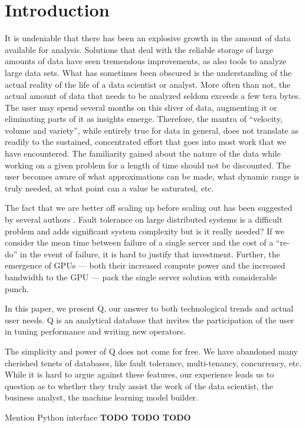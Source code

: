 \section{Introduction}

It is undeniable that there has been an explosive growth in the 
amount of data available for analysis. Solutions that 
deal with the reliable storage of large amounts of data have seen tremendous
improvements, as also tools to analyze large data sets. What has sometimes been
obscured is the understanding of the actual reality of the life of a data
scientist or analyst. More often than not, the actual amount of data that needs
to be analyzed seldom exceeds a few tera bytes\cite{Dittrich2015}. The user may spend
several months on this sliver of data, augmenting it or eliminating parts of it
as insights emerge. Therefore, the mantra of ``velocity, volume and variety'',
while entirely true for data in general, does not translate as readily to the
sustained, concentrated effort that goes into most work that we have
encountered. The familiarity gained about the nature of the data 
while working on a given problem for a length of time should not be discounted. The
user becomes aware of what approximations can be made, what dynamic range is
truly needed, at what point can a value be saturated, etc.

The fact that we are better off scaling up before scaling out has been suggested
by several authors \cite{Rowstron2012,Dittrich2015}. 
Fault tolerance on large distributed systems is a difficult
problem and adds significant system complexity but is it really needed?
If we consider the mean time between failure of a single server and
the cost of a ``re-do'' in the event of failure,
it is hard to justify that investment. 
Further, the emergence of GPUs --- both their increased compute power and the
increased  bandwidth to the GPU --- pack the single server solution with
considerable punch.

In this paper, we present Q, our answer to both technological trends and actual
user needs. Q is an analytical database that invites the participation of the
user in tuning performance and writing new operators. 

The simplicity and power of Q does not come for free. We have abandoned many
cherished tenets of databases, like fault tolerance, multi-tenancy, concurrency,
etc. While it is hard to argue against these features, our experience leads us
to question as to whether they truly assist the work of the data scientist, the
business analyst, the machine learning model builder. 

Mention Python interface {\bf TODO TODO TODO }
